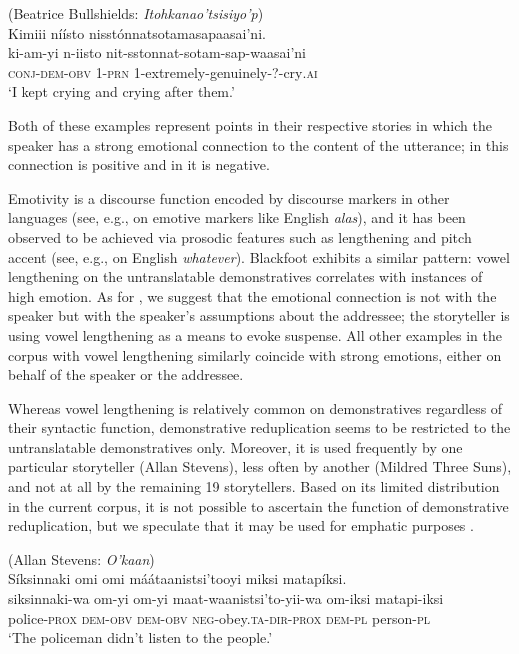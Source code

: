 \documentclass[output=paper,colorlinks,citecolor=brown]{langscibook}
\begin{document}
\ea\label{ex:bliss:20} (Beatrice Bullshields: \textit{Itohkanao’tsisiyo’p})\\
{Kimiii níísto nisstónnatsotamasapaasai’ni.}\\
\gll ki-am-yi n-iisto nit-sstonnat-sotam-sap-waasai’ni\\
     \textsc{conj-dem-obv} \textsc{1-prn} \textsc{1-}extremely-genuinely-?-cry\textsc{.ai}\\
 ‘I kept crying and crying after them.’ 
\z

Both of these examples represent points in their respective stories in which the speaker has a strong emotional connection to the content of the utterance; in  this connection is positive and in  it is negative.

Emotivity is a discourse function encoded by discourse markers in other languages (see, e.g., \citet{Rett2018} on emotive markers like English \textit{alas}), and it has been observed to be achieved via prosodic features such as lengthening and pitch accent (see, e.g., \citet{BenusGravanoHirschberg2007} on English \textit{whatever}). Blackfoot exhibits a similar pattern: vowel lengthening on the untranslatable demonstratives correlates with instances of high emotion. As for , we suggest that the emotional connection is not with the speaker but with the speaker’s assumptions about the addressee; the storyteller is using vowel lengthening as a means to evoke suspense. All other examples in the corpus with vowel lengthening similarly coincide with strong emotions, either on behalf of the speaker or the addressee.

Whereas vowel lengthening is relatively common on demonstratives regardless of their syntactic function, demonstrative reduplication seems to be restricted to the untranslatable demonstratives only. Moreover, it is used frequently by one particular storyteller (Allan Stevens), less often by another (Mildred Three Suns), and not at all by the remaining 19 storytellers. Based on its limited distribution in the current corpus, it is not possible to ascertain the function of demonstrative reduplication, but we speculate that it may be used for emphatic purposes .

\ea\label{ex:bliss:21} (Allan Stevens: \textit{O’kaan})\\
{Síksinnaki omi omi máátaanistsi’tooyi miksi matapíksi.}\\
\gll siksinnaki-wa om-yi om-yi maat-waanistsi’to-yii-wa om-iksi matapi-iksi\\
     police-\textsc{prox} \textsc{dem-obv} \textsc{dem-obv} \textsc{neg}-obey.\textsc{ta-dir-prox} \textsc{dem-pl} person-\textsc{pl}\\
 ‘The policeman didn’t listen to the people.’ 
\z
\end{document}
